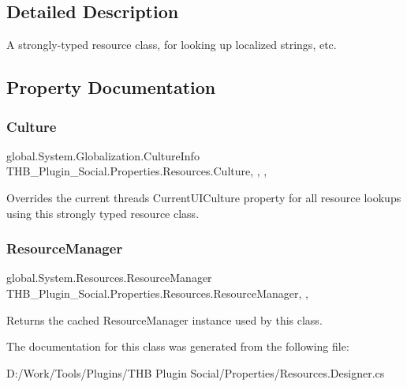 \subsection{Detailed Description}
A strongly-\/typed resource class, for looking up localized strings, etc. 



\subsection{Property Documentation}
\mbox{\label{class_t_h_b___plugin___social_1_1_properties_1_1_resources_a4b1ade895a2309c9b4020346f8ed51c3}} 
\subsubsection{\texorpdfstring{Culture}{Culture}}
{\footnotesize\ttfamily global.\+System.\+Globalization.\+Culture\+Info T\+H\+B\+\_\+\+Plugin\+\_\+\+Social.\+Properties.\+Resources.\+Culture\hspace{0.3cm}{\ttfamily [static]}, {\ttfamily [get]}, {\ttfamily [set]}, {\ttfamily [package]}}



Overrides the current thread\textquotesingle{}s Current\+U\+I\+Culture property for all resource lookups using this strongly typed resource class. 

\mbox{\label{class_t_h_b___plugin___social_1_1_properties_1_1_resources_a480b09e333fe9a3de46ecf95895fdde8}} 
\subsubsection{\texorpdfstring{Resource\+Manager}{ResourceManager}}
{\footnotesize\ttfamily global.\+System.\+Resources.\+Resource\+Manager T\+H\+B\+\_\+\+Plugin\+\_\+\+Social.\+Properties.\+Resources.\+Resource\+Manager\hspace{0.3cm}{\ttfamily [static]}, {\ttfamily [get]}, {\ttfamily [package]}}



Returns the cached Resource\+Manager instance used by this class. 



The documentation for this class was generated from the following file\+:\begin{DoxyCompactItemize}
\item 
D\+:/\+Work/\+Tools/\+Plugins/\+T\+H\+B Plugin Social/\+Properties/Resources.\+Designer.\+cs\end{DoxyCompactItemize}
